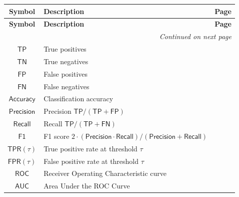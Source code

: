 \documentclass{amsart}
\newenvironment{glossarytable}{%
	\renewcommand{\arraystretch}{1.3}%
	\setlength{\tabcolsep}{4pt}%
	\begin{longtable}{|c|p{11cm}|c|}
		\hline
		\textbf{Symbol} & \textbf{Description} & \textbf{Page} \\
		\hline
		\endfirsthead
		\hline
		\textbf{Symbol} & \textbf{Description} & \textbf{Page} \\
		\hline
		\endhead
		\hline
		\multicolumn{3}{r}{\textit{Continued on next page}} \\
		\endfoot
		\hline
		\endlastfoot
}{%
	\end{longtable}%
}
\theoremstyle{break}
\begin{document}
\begin{glossarytable}
		$\mathsf{TP}$ & True positives & \pageref{def:tp} \\
		$\mathsf{TN}$ & True negatives & \pageref{def:tn} \\
		$\mathsf{FP}$ & False positives & \pageref{def:fp} \\
		$\mathsf{FN}$ & False negatives & \pageref{def:fn} \\
		$\mathsf{Accuracy}$ & Classification accuracy & \pageref{def:accuracy} \\
		$\mathsf{Precision}$ & Precision $\mathsf{TP}/(\mathsf{TP}+\mathsf{FP})$ & \pageref{def:precision} \\
		$\mathsf{Recall}$ & Recall $\mathsf{TP}/(\mathsf{TP}+\mathsf{FN})$ & \pageref{def:recall} \\
		$\mathsf{F1}$ & F1 score $2 \cdot (\mathsf{Precision} \cdot \mathsf{Recall})/(\mathsf{Precision} + \mathsf{Recall})$ & \pageref{def:f1-score} \\
		$\mathsf{TPR}(\tau)$ & True positive rate at threshold $\tau$ & \pageref{def:tpr} \\
		$\mathsf{FPR}(\tau)$ & False positive rate at threshold $\tau$ & \pageref{def:fpr} \\
		$\mathsf{ROC}$ & Receiver Operating Characteristic curve & \pageref{def:roc} \\
		$\mathsf{AUC}$ & Area Under the ROC Curve & \pageref{def:auc} \\
		

\end{glossarytable}
\end{document}
